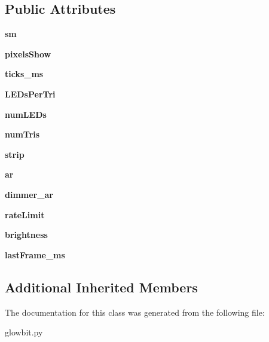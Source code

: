 \subsection*{Public Attributes}
\begin{DoxyCompactItemize}
\item 
\mbox{\label{classglowbit_1_1triangle_a826d6fe21b7e8fda3ad780fc83d83660}} 
{\bfseries sm}
\item 
\mbox{\label{classglowbit_1_1triangle_ae8c7b20c01f071d0cc9bae97f414c2cf}} 
{\bfseries pixels\+Show}
\item 
\mbox{\label{classglowbit_1_1triangle_adea9ee1f6a2446546c62847f705071c3}} 
{\bfseries ticks\+\_\+ms}
\item 
\mbox{\label{classglowbit_1_1triangle_ac6716c3af9a0c7928e5ef26507e9d07d}} 
{\bfseries L\+E\+Ds\+Per\+Tri}
\item 
\mbox{\label{classglowbit_1_1triangle_ac49c332e3aaaf1c4a1c909dee4b6cc2f}} 
{\bfseries num\+L\+E\+Ds}
\item 
\mbox{\label{classglowbit_1_1triangle_a3e7ae1193100b0816a83b715f6862ab7}} 
{\bfseries num\+Tris}
\item 
\mbox{\label{classglowbit_1_1triangle_a91f7966af0e17ef99e68ec8cf672e313}} 
{\bfseries strip}
\item 
\mbox{\label{classglowbit_1_1triangle_a1cd0a82b5c269c019c37f7bb2892680d}} 
{\bfseries ar}
\item 
\mbox{\label{classglowbit_1_1triangle_afadb993656f4bb24c5923a6e677f214b}} 
{\bfseries dimmer\+\_\+ar}
\item 
\mbox{\label{classglowbit_1_1triangle_abb1773a93e2fafeae40f8a2cc4e77a81}} 
{\bfseries rate\+Limit}
\item 
\mbox{\label{classglowbit_1_1triangle_ad55aff3faee32703d2dec714a5c42de5}} 
{\bfseries brightness}
\item 
\mbox{\label{classglowbit_1_1triangle_a9b282fc22b8e029983f33c24f1a4ca01}} 
{\bfseries last\+Frame\+\_\+ms}
\end{DoxyCompactItemize}
\subsection*{Additional Inherited Members}


The documentation for this class was generated from the following file\+:\begin{DoxyCompactItemize}
\item 
glowbit.\+py\end{DoxyCompactItemize}
